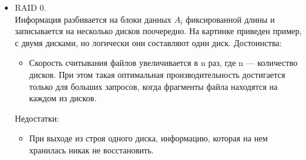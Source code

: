 \begin {itemize}
\item RAID 0. \\
Информация разбивается на блоки данных $A_{i}$ фиксированной длины и записывается на несколько дисков поочередно. На картинке приведен пример, с двумя дисками, но логически они составляют один диск. 
Достоинства:
\begin {itemize}
\item Скорость считывания файлов увеличивается в n раз, где n — количество дисков. При этом такая оптимальная производительность достигается только для больших запросов, когда фрагменты файла находятся на каждом из дисков.
\end {itemize}

Недостатки:
\begin {itemize}
\item При выходе из строя одного диска, информацию, которая на нем хранилась никак не восстановить.
\end {itemize}



\end{itemize}

